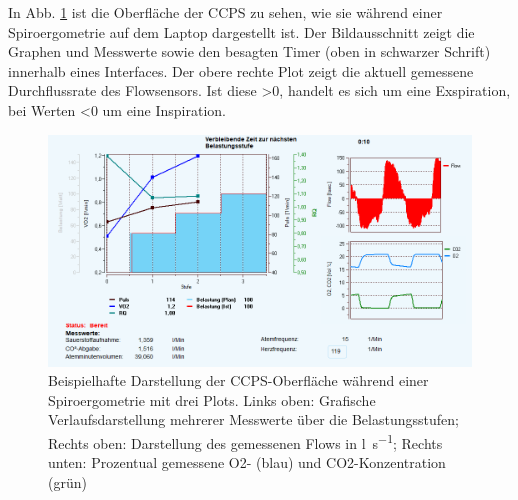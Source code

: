 In Abb. \ref{pic:pic12} ist die Oberfläche der \gls{CCPS} zu sehen, wie sie während einer Spiroergometrie auf dem Laptop dargestellt ist. Der Bildausschnitt zeigt die Graphen und Messwerte sowie den besagten Timer (oben in schwarzer Schrift) innerhalb eines Interfaces. Der obere rechte Plot zeigt die aktuell gemessene Durchflussrate des Flowsensors. Ist diese >0, handelt es sich um eine Exspiration, bei Werten <0 um eine Inspiration.
%
\begin{figure}[H]
	\centering
	\includegraphics[width=\textwidth]{Bilder/sw_screen.png}
	\caption[Beispielhafte Software-Oberfläche während einer Spiroergometrie]{Beispielhafte Darstellung der \gls{CCPS}-Oberfläche während einer Spiroergometrie mit drei Plots. Links oben: Grafische Verlaufsdarstellung mehrerer Messwerte über die Belastungsstufen; Rechts oben: Darstellung des gemessenen Flows in \si{\litre\per\second}; Rechts unten: Prozentual gemessene \gls{O2}- (blau) und \gls{CO2}-Konzentration (grün)}
	\label{pic:pic12}
\end{figure}
%
